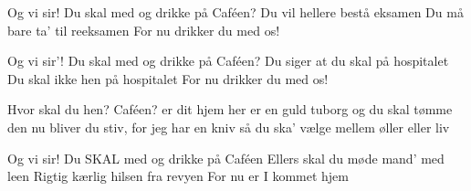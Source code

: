 \documentclass[a4paper,11pt]{article}
\begin{document}
\begin{song}
Og vi sir!
Du skal med og drikke på Caféen?
 Du vil hellere bestå eksamen
 Du må bare ta' til reeksamen
 For nu drikker du med os!

Og vi sir’!
Du skal med og drikke på Caféen?
 Du siger at du skal på hospitalet
 Du skal ikke hen på hospitalet 
 For nu drikker du med os!

Hvor skal du hen? Caféen? er dit hjem
her er en guld tuborg og du skal tømme den
 nu bliver du stiv, 
 for jeg har en kniv
 så du ska’ vælge mellem øller eller liv

Og vi sir!
Du SKAL med og drikke på Caféen
 Ellers skal du møde mand' med leen
 Rigtig kærlig hilsen fra revyen
 For nu er I kommet hjem



\end{song}
\end{document}
